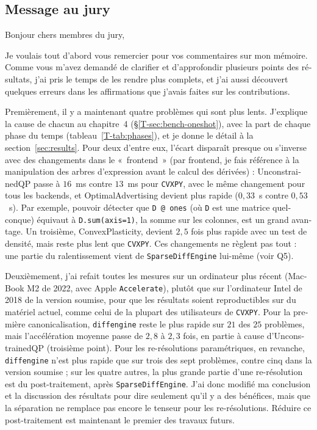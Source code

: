\documentclass[letterpaper,12pt]{article}
\begin{document}
\begin{otherlanguage}{french}
\section*{Message au jury}

Bonjour chers membres du jury,

Je voulais tout d'abord vous remercier pour vos commentaires sur mon mémoire. Comme vous m'avez
demandé de clarifier et d'approfondir plusieurs points des résultats, j'ai pris le temps de les
rendre plus complets, et j'ai aussi découvert quelques erreurs dans les affirmations que j'avais
faites sur les contributions.

Premièrement, il y a maintenant quatre problèmes qui sont plus lents. J'explique la cause de
chacun au chapitre~4 (\S\ref{T-sec:bench-oneshot}), avec la part de chaque phase du temps
(tableau~\ref{T-tab:phases}), et je donne le détail à la section~\ref{sec:results}. Pour deux d'entre eux, l'écart
disparaît presque ou s'inverse avec des changements dans le «~frontend~» (par frontend, je fais
référence à la manipulation des arbres d'expression avant le calcul des dérivées) :
UnconstrainedQP passe à $16$~ms contre $13$~ms pour \texttt{CVXPY}, avec le même changement pour
tous les backends, et OptimalAdvertising devient plus rapide ($0{,}33$~s contre $0{,}53$~s). Par exemple, pouvoir détecter que
\texttt{D @ ones} (où \texttt{D} est une matrice quelconque) équivaut à \texttt{D.sum(axis=1)},
la somme sur les colonnes, est un grand avantage. Un troisième,
ConvexPlasticity, devient $2{,}5$ fois plus rapide avec un test de densité, mais reste plus lent
que \texttt{CVXPY}. Ces changements ne règlent pas tout : une partie du ralentissement vient de
\texttt{SparseDiffEngine} lui-même (voir Q5).

Deuxièmement, j'ai refait toutes les mesures sur un ordinateur plus récent (MacBook M2 de 2022,
avec Apple \texttt{Accelerate}), plutôt que sur l'ordinateur Intel de 2018 de la version
soumise, pour que les résultats soient reproductibles sur du matériel actuel, comme celui de la
plupart des utilisateurs de \texttt{CVXPY}. Pour la première canonicalisation, \texttt{diffengine} reste le
plus rapide sur $21$ des $25$ problèmes, mais l'accélération moyenne passe de $2{,}8$ à
$2{,}3$ fois, en partie à cause d'UnconstrainedQP (troisième point). Pour les re-résolutions paramétriques, en revanche, \texttt{diffengine}
n'est plus rapide que sur trois des sept problèmes, contre cinq dans la version soumise ; sur
les quatre autres, la plus grande partie d'une re-résolution est du post-traitement, après
\texttt{SparseDiffEngine}. J'ai donc modifié ma conclusion et la discussion des résultats pour
dire seulement qu'il y a des bénéfices, mais que la séparation ne remplace pas encore le tenseur
pour les re-résolutions. Réduire ce post-traitement est maintenant le premier des travaux
futurs.


\end{otherlanguage}
\end{document}
